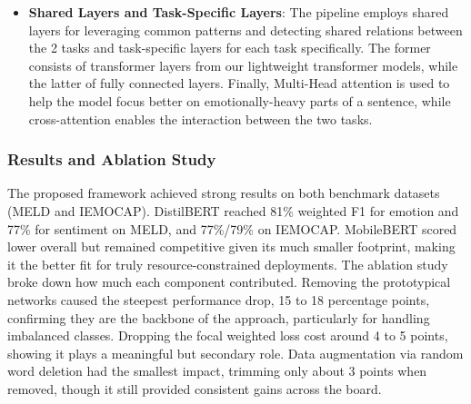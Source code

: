 \documentclass[a4paper,12pt]{article}
\begin{document}
\begin{itemize}
        and $\gamma$ is a modulating factor, so the model will learn to focus on more difficult-to-classify examples. The final loss function is a weighted combination of focal weighted loss and prototypical network loss functions for both tasks.
    \item{\textbf{Shared Layers and Task-Specific Layers}}: The pipeline employs shared layers for leveraging common patterns and detecting shared relations between the 2 tasks and task-specific layers for each task specifically. The former consists of transformer layers from our lightweight transformer models, while the latter of fully connected layers. Finally, Multi-Head attention is used to help the model focus better on emotionally-heavy parts of a sentence, while cross-attention enables the interaction between the two tasks.
\end{itemize}

\subsubsection{Results and Ablation Study}
The proposed framework achieved strong results on both benchmark datasets (MELD and IEMOCAP). DistilBERT reached 81\% weighted F1 for emotion and 77\% for sentiment on MELD, and 77\%/79\% on IEMOCAP. MobileBERT scored lower overall but remained competitive given its much smaller footprint, making it the better fit for truly resource-constrained deployments.
The ablation study broke down how much each component contributed. Removing the prototypical networks caused the steepest performance drop, 15 to 18 percentage points, confirming they are the backbone of the approach, particularly for handling imbalanced classes. Dropping the focal weighted loss cost around 4 to 5 points, showing it plays a meaningful but secondary role. Data augmentation via random word deletion had the smallest impact, trimming only about 3 points when removed, though it still provided consistent gains across the board.

\clearpage


\end{document}
